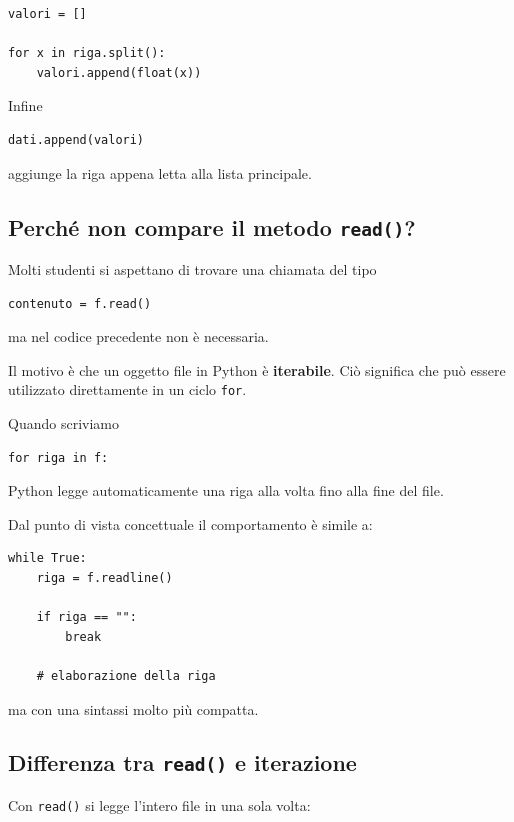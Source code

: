 \documentclass[11pt,a4paper]{book}
\begin{document}
\begin{lstlisting}[style=python]
valori = []

for x in riga.split():
    valori.append(float(x))
\end{lstlisting}

Infine

\begin{lstlisting}[style=python]
dati.append(valori)
\end{lstlisting}

aggiunge la riga appena letta alla lista principale.

\subsection{Perché non compare il metodo \texttt{read()}?}

Molti studenti si aspettano di trovare una chiamata del tipo

\begin{lstlisting}[style=python]
contenuto = f.read()
\end{lstlisting}

ma nel codice precedente non è necessaria.

Il motivo è che un oggetto file in Python è \textbf{iterabile}. Ciò significa che può essere utilizzato direttamente in un ciclo \texttt{for}.

Quando scriviamo

\begin{lstlisting}[style=python]
for riga in f:
\end{lstlisting}

Python legge automaticamente una riga alla volta fino alla fine del file.

Dal punto di vista concettuale il comportamento è simile a:

\begin{lstlisting}[style=python]
while True:
    riga = f.readline()

    if riga == "":
        break

    # elaborazione della riga
\end{lstlisting}

ma con una sintassi molto più compatta.

\subsection{Differenza tra \texttt{read()} e iterazione}

Con \texttt{read()} si legge l'intero file in una sola volta:
\end{document}
